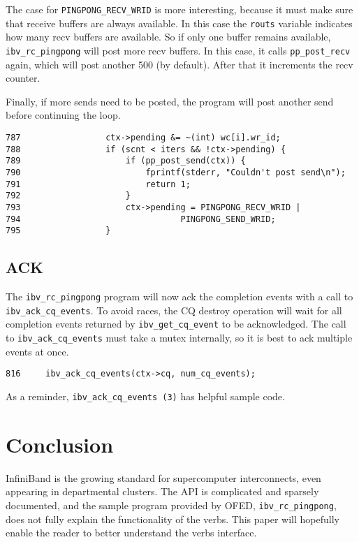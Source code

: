 \documentclass[letterpaper,12pt]{article}
\begin{document}
The case for {\tt PINGPONG\_RECV\_WRID} is more interesting, because
it must make sure that receive buffers are always available. In this case
the {\tt routs} variable indicates how many recv buffers are available.
So if only one buffer remains available, {\tt ibv\_rc\_pingpong} will post
more recv buffers. In this case, it calls {\tt pp\_post\_recv} again,
which will post another 500 (by default).  After that it increments the
recv counter.

Finally, if more sends need to be posted, the program will post another
send before continuing the loop.

\lstset{language=C, caption=Posting Another Send}
\begin{lstlisting}
787                 ctx->pending &= ~(int) wc[i].wr_id;
788                 if (scnt < iters && !ctx->pending) {
789                     if (pp_post_send(ctx)) {
790                         fprintf(stderr, "Couldn't post send\n");
791                         return 1;
792                     }
793                     ctx->pending = PINGPONG_RECV_WRID |
794                                PINGPONG_SEND_WRID;
795                 }
\end{lstlisting}

\subsection{ACK}
The {\tt ibv\_rc\_pingpong} program will now ack the completion events with a call to
\\ {\tt ibv\_ack\_cq\_events}. To avoid races, the CQ destroy operation will wait for all
completion events returned by {\tt ibv\_get\_cq\_event} to be acknowledged.
The call to {\tt ibv\_ack\_cq\_events} must take a mutex internally, so it is best
to ack multiple events at once.

\lstset{language=C, caption=}
\begin{lstlisting}
816     ibv_ack_cq_events(ctx->cq, num_cq_events);
\end{lstlisting}

As a reminder, {\tt ibv\_ack\_cq\_events (3)} has helpful sample code.

\section{Conclusion} InfiniBand is the growing standard for supercomputer
interconnects, even appearing in departmental clusters.  The API is
complicated and sparsely documented, and the sample program provided
by OFED, {\tt ibv\_rc\_pingpong}, does not fully explain the
functionality of the verbs. This paper will hopefully enable the reader
to better understand the verbs interface.
\end{document}
